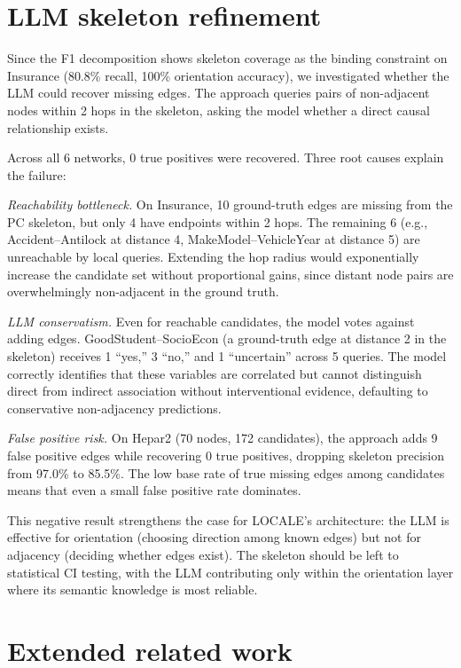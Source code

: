 \documentclass{article}
\begin{document}
\section{LLM skeleton refinement}
\label{app:skeleton-refine}

Since the F1 decomposition shows skeleton coverage as the binding constraint on Insurance (80.8\% recall, 100\% orientation accuracy), we investigated whether the LLM could recover missing edges. The approach queries pairs of non-adjacent nodes within 2 hops in the skeleton, asking the model whether a direct causal relationship exists.

Across all 6 networks, 0 true positives were recovered. Three root causes explain the failure:

\textit{Reachability bottleneck.} On Insurance, 10 ground-truth edges are missing from the PC skeleton, but only 4 have endpoints within 2 hops. The remaining 6 (e.g., Accident--Antilock at distance 4, MakeModel--VehicleYear at distance 5) are unreachable by local queries. Extending the hop radius would exponentially increase the candidate set without proportional gains, since distant node pairs are overwhelmingly non-adjacent in the ground truth.

\textit{LLM conservatism.} Even for reachable candidates, the model votes against adding edges. GoodStudent--SocioEcon (a ground-truth edge at distance 2 in the skeleton) receives 1 ``yes,'' 3 ``no,'' and 1 ``uncertain'' across 5 queries. The model correctly identifies that these variables are correlated but cannot distinguish direct from indirect association without interventional evidence, defaulting to conservative non-adjacency predictions.

\textit{False positive risk.} On Hepar2 (70 nodes, 172 candidates), the approach adds 9 false positive edges while recovering 0 true positives, dropping skeleton precision from 97.0\% to 85.5\%. The low base rate of true missing edges among candidates means that even a small false positive rate dominates.

This negative result strengthens the case for LOCALE's architecture: the LLM is effective for orientation (choosing direction among known edges) but not for adjacency (deciding whether edges exist). The skeleton should be left to statistical CI testing, with the LLM contributing only within the orientation layer where its semantic knowledge is most reliable.


\section{Extended related work}
\label{app:extended-rw}
\end{document}
